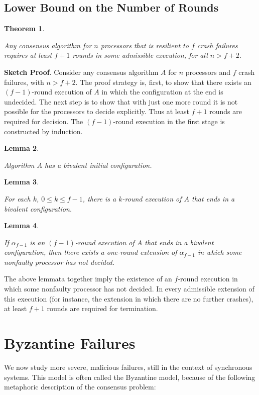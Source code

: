 \documentclass{article}
\newtheorem{thm}{Theorem}[section]
\newtheorem{lem}[thm]{Lemma}
\newenvironment{theorem}{\begin{thm}\begin{rm}}%
{\end{rm}\end{thm}}
\newenvironment{lemma}{\begin{lem}\begin{rm}}%
{\end{rm}\end{lem}}
\begin{document}
\subsection{Lower Bound on the Number of Rounds}
\begin{theorem}
Any consensus algorithm for $n$ processors that is resilient to $f$ crash failures requires at least $f +1$ rounds in some admissible execution, for all $n > f + 2$.
\end{theorem}
\textbf{Sketch Proof}. Consider any consensus algorithm $A$ for $n$ processors and $f$ crash failures, with $n > f + 2$. The proof strategy is, first, to show that there exists an $(f - 1)$-round execution of $A$ in which the configuration at the end is undecided. The next step is to show that with just one more round it is not possible for the processors to decide explicitly. Thus at least $f + 1$ rounds are required for decision. The $(f - 1)$-round execution in the first stage is constructed by induction.

\begin{lemma} Algorithm $A$ has a bivalent initial configuration.
\end{lemma}

\begin{lemma} For each $k$, $0 \leq k \leq f-1$, there is a $k$-round execution of $A$ that ends in a bivalent configuration.
\end{lemma} 

\begin{lemma} If $\alpha_{f-1}$ is an $(f-1)$-round execution of $A$ that ends in a bivalent configuration, then there exists a one-round extension of $\alpha_{f-1}$ in which some nonfaulty processor has not decided.
\end{lemma}

The above lemmata together imply the existence of an $f$-round execution in which some nonfaulty processor has not decided. In every admissible extension of this execution (for instance, the extension in which there are no further crashes), at least $f +1$ rounds are required for termination. 

\section{Byzantine Failures}
We now study more severe, malicious failures, still in the context of  synchronous systems. This model is often called the Byzantine model, because of the following metaphoric description of the consensus problem: 
\end{document}
